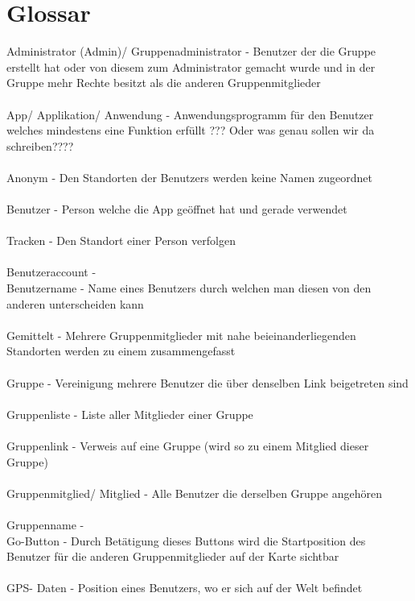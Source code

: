 \section{Glossar}

Administrator (Admin)/ Gruppenadministrator - Benutzer der die Gruppe erstellt hat oder von diesem zum Administrator gemacht wurde und in der Gruppe mehr Rechte besitzt als die anderen Gruppenmitglieder\\
\\
App/ Applikation/ Anwendung - Anwendungsprogramm für den Benutzer welches mindestens eine Funktion erfüllt ??? Oder was genau sollen wir da schreiben????\\
\\
Anonym - Den Standorten der Benutzers werden keine Namen zugeordnet\\
\\
Benutzer - Person welche die App geöffnet hat und gerade verwendet\\
\\
Tracken - Den Standort einer Person verfolgen\\
\\
Benutzeraccount -
\\
Benutzername - Name eines Benutzers durch welchen man diesen von den anderen unterscheiden kann\\
\\
Gemittelt - Mehrere Gruppenmitglieder mit nahe beieinanderliegenden Standorten werden zu einem zusammengefasst\\
\\
Gruppe - Vereinigung mehrere Benutzer die über denselben Link beigetreten sind\\
\\
Gruppenliste - Liste aller Mitglieder einer Gruppe\\
\\
Gruppenlink - Verweis auf eine Gruppe (wird so zu einem Mitglied dieser Gruppe)\\
\\
Gruppenmitglied/ Mitglied - Alle Benutzer die derselben Gruppe angehören\\
\\
Gruppenname -
\\
Go-Button - Durch Betätigung dieses Buttons wird die Startposition des Benutzer für die anderen Gruppenmitglieder auf der Karte sichtbar\\
\\
GPS- Daten - Position eines Benutzers, wo er sich auf der Welt befindet\\
